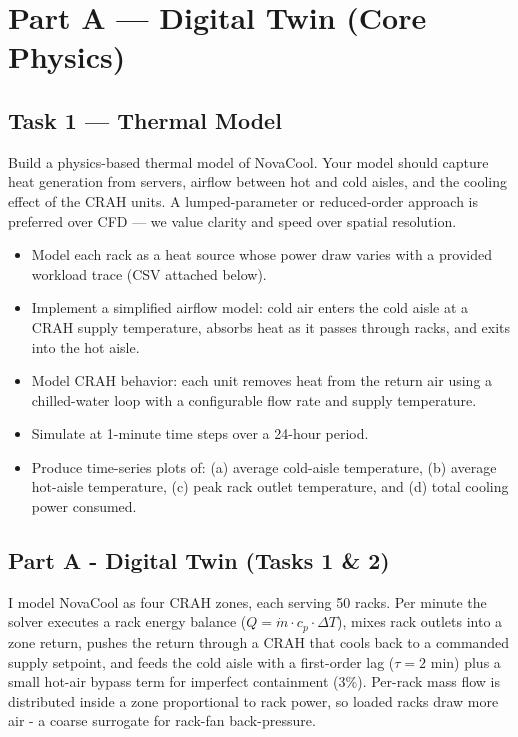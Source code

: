 \documentclass[letterpaper,11pt]{article}
\begin{document}
	
	\section{Part A — Digital Twin (Core Physics)}
	
	\subsection{Task 1 — Thermal Model}
	Build a physics-based thermal model of NovaCool. Your model should capture heat generation
	from servers, airflow between hot and cold aisles, and the cooling effect of the CRAH units. A
	lumped-parameter or reduced-order approach is preferred over CFD — we value clarity and speed
	over spatial resolution.
	\begin{itemize}
	\item Model each rack as a heat source whose power draw varies with a provided workload trace
	(CSV attached below).
	\item Implement a simplified airflow model: cold air enters the cold aisle at a CRAH supply
	temperature, absorbs heat as it passes through racks, and exits into the hot aisle.
	\item Model CRAH behavior: each unit removes heat from the return air using a chilled-water loop
	with a configurable flow rate and supply temperature.
	\item Simulate at 1-minute time steps over a 24-hour period.
	\item Produce time-series plots of: (a) average cold-aisle temperature, (b) average hot-aisle
	temperature, (c) peak rack outlet temperature, and (d) total cooling power consumed.
	\end{itemize}
	\vspace{4pt}
	
	\subsection{Part A - Digital Twin (Tasks 1 \& 2)}
	I model NovaCool as four CRAH zones, each serving 50 racks. Per minute the solver executes a rack energy balance ($Q = \dot{m} \cdot c_p \cdot \Delta T$), mixes rack outlets into a zone return, pushes the return through a CRAH that cools back to a commanded supply setpoint, and feeds the cold aisle with a first-order lag ($\tau = 2$ min) plus a small hot-air bypass term for imperfect containment ($3\%$). Per-rack mass flow is distributed inside a zone proportional to rack power, so loaded racks draw more air - a coarse surrogate for rack-fan back-pressure.
	
\end{document}
